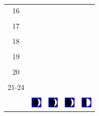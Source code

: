 \documentclass[a4paper,12pt, tikz]{scrartcl}
\begin{document}
\begin{tabularx}{\linewidth}{|c|X|X|p{2cm}|p{2cm}|}
            &   &       &    &   \\
          \hline
          16&   &                 &    &   \\
            &   &       &    &   \\
          \hline
          17&   &                 &    &   \\
            &   &       &    &   \\
          \hline
          18&   &                 &    &   \\
            &   &       &    &   \\
          \hline
          19&   &                 &     &   \\
            &   &       &    &   \\
          \hline
          20&   &              &    &   \\
            &   &       &    &   \\
          \hline 
          21-24&   &              &    &   \\
            &   &       &    &   \\
          \hline
                      & \vspace{0.01cm} \centerline{\includegraphics[width=0.5cm]{moon_phases/Moon_phase_1.svg.png}} \vspace{0.1cm} & \vspace{0.01cm} \centerline{\includegraphics[width=0.5cm]{moon_phases/Moon_phase_1.svg.png}} \vspace{0.1cm} & \vspace{0.01cm} \centerline{\includegraphics[width=0.5cm]{moon_phases/Moon_phase_1.svg.png}} \vspace{0.1cm} & \vspace{0.01cm} \centerline{\includegraphics[width=0.5cm]{moon_phases/Moon_phase_2.svg.png}} \vspace{0.1cm}\\
          \hline    
        \end{tabularx}
\end{document}
